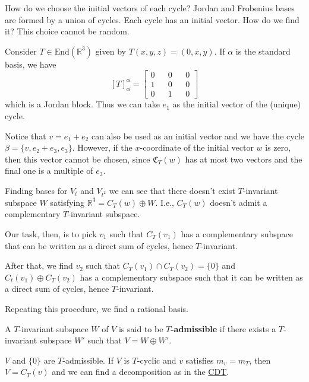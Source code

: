 How do we choose the initial vectors of each cycle? Jordan and Frobenius bases are formed by a union of cycles. Each cycle has an initial vector. How do we find it? This choice cannot be random.

\begin{example}
	Consider $T \in \text{End}(\mathbb{R}^3)$ given by $T(x,y,z) = (0,x,y)$. If $\alpha$ is the standard basis, we have 
	\[
		[T]_\alpha^\alpha = \begin{bmatrix}
			0 && 0 && 0 \\
			1 && 0 && 0 \\
			0 && 1 && 0
		\end{bmatrix}
	\]
	which is a Jordan block. Thus we can take $e_1$ as the initial vector of the (unique) cycle.

	Notice that $v = e_1 + e_2$ can also be used as an initial vector and we have the cycle $\beta = \{ v, e_2 + e_3, e_3 \}$. However, if the $x$-coordinate of the initial vector $w$ is zero, then this vector cannot be chosen, since $\mathfrak{C}_T(w)$ has at most two vectors and the final one is a multiple of $e_3$. 

	Finding bases for $V_t$ and $V_{t^2}$ we can see that there doesn't exist $T$-invariant subspace $W$ satisfying $\mathbb{R}^3 = C_T(w) \oplus W$. I.e., $C_T(w)$ doesn't admit a complementary $T$-invariant subspace.
\end{example}

Our task, then, is to pick $v_1$ such that $C_T(v_1)$ has a complementary subspace that can be written as a direct sum of cycles, hence $T$-invariant.

After that, we find $v_2$ such that $C_T(v_1) \cap C_T(v_2) = \{ 0 \}$ and $C_t(v_1) \oplus C_T(v_2)$ has a complementary subspace such that it can be written as a direct sum of cycles, hence $T$-invariant. 

Repeating this procedure, we find a rational basis.

\begin{definition}
	A $T$-invariant subspace $W$ of $V$ is said to be \textbf{$T$-admissible} if there exists a $T$-invariant subspace $W'$ such that $V = W \oplus W'$.
\end{definition}

\begin{example}
	$V$ and $\{ 0 \}$ are $T$-admissible. If $V$ is $T$-cyclic and $v$ satisfies $m_v = m_T$, then $V = C_T(v)$ and we can find a decomposition as in the \hyperref[thm:CDT]{CDT}.
\end{example}

